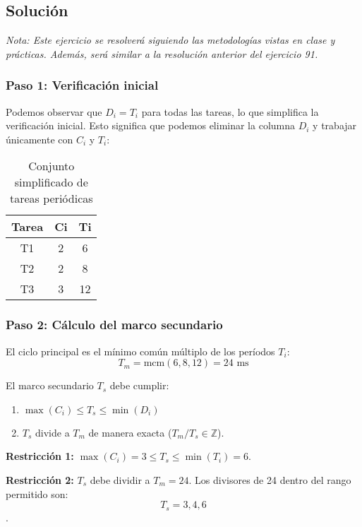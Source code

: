 \documentclass[a4paper,12pt]{article}
\begin{document}
\subsection{Solución}
\begin{tcolorbox}[colback=gray!5!white,colframe=gray!75!black]
    \textit{Nota: Este ejercicio se resolverá siguiendo las metodologías vistas en clase y prácticas. Además, será similar a la resolución anterior del ejercicio 91.}
\end{tcolorbox}

\subsubsection{Paso 1: Verificación inicial}
Podemos observar que \(D_i = T_i\) para todas las tareas, lo que simplifica la verificación inicial. Esto significa que podemos eliminar la columna \(D_i\) y trabajar únicamente con \(C_i\) y \(T_i\):

\begin{table}[H]
\centering
\begin{tabular}{|c|c|c|}
\hline
\textbf{Tarea} & \textbf{Ci} & \textbf{Ti} \\ \hline
T1 & 2 & 6 \\ \hline
T2 & 2 & 8 \\ \hline
T3 & 3 & 12 \\ \hline
\end{tabular}
\caption{Conjunto simplificado de tareas periódicas}
\end{table}

\subsubsection{Paso 2: Cálculo del marco secundario}
El ciclo principal es el mínimo común múltiplo de los períodos \(T_i\):
\[ T_m = \text{mcm}(6, 8, 12) = 24 \text{ ms} \]

El marco secundario \(T_s\) debe cumplir:
\begin{enumerate}
    \item \(\max(C_i) \leq T_s \leq \min(D_i)\)
    \item \(T_s\) divide a \(T_m\) de manera exacta (\(T_m / T_s \in \mathbb{Z}\)).
\end{enumerate}

\textbf{Restricción 1:} \(\max(C_i) = 3 \leq T_s \leq \min(T_i) = 6\).

\textbf{Restricción 2:} \(T_s\) debe dividir a \(T_m = 24\). Los divisores de 24 dentro del rango permitido son:\[T_s = 3, 4, 6\].
\end{document}
